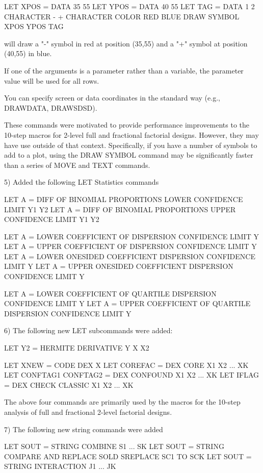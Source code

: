            LET XPOS = DATA 35 55
           LET YPOS = DATA 40 55
           LET TAG  = DATA  1  2
           CHARACTER  - +
           CHARACTER COLOR RED BLUE
           DRAW SYMBOL XPOS YPOS TAG

        will draw a "-" symbol in red at position (35,55) and a "+" symbol
        at position (40,55) in blue.

        If one of the arguments is a parameter rather than a variable, the
        parameter value will be used for all rows.

        You can specify screen or data coordinates in the standard way
        (e.g., DRAWDATA, DRAWSDSD).

    These commands were motivated to provide performance improvements to
    the 10-step macros for 2-level full and fractional factorial designs.
    However, they may have use outside of that context.  Specifically,
    if you have a number of symbols to add to a plot, using the
    DRAW SYMBOL command may be significantly faster than a series of
    MOVE and TEXT commands.

 5) Added the following LET Statistics commands

       LET A = DIFF OF BINOMIAL PROPORTIONS LOWER CONFIDENCE LIMIT Y1 Y2
       LET A = DIFF OF BINOMIAL PROPORTIONS UPPER CONFIDENCE LIMIT Y1 Y2

       LET A = LOWER COEFFICIENT OF DISPERSION CONFIDENCE LIMIT Y
       LET A = UPPER COEFFICIENT OF DISPERSION CONFIDENCE LIMIT Y
       LET A = LOWER ONESIDED COEFFICIENT DISPERSION CONFIDENCE LIMIT Y
       LET A = UPPER ONESIDED COEFFICIENT DISPERSION CONFIDENCE LIMIT Y

       LET A = LOWER COEFFICIENT OF QUARTILE DISPERSION CONFIDENCE LIMIT Y
       LET A = UPPER COEFFICIENT OF QUARTILE DISPERSION CONFIDENCE LIMIT Y

 6) The following new LET subcommands were added:

       LET Y2 = HERMITE DERIVATIVE Y X X2

       LET XNEW = CODE DEX X
       LET COREFAC = DEX CORE X1 X2 ... XK
       LET CONFTAG1 CONFTAG2 = DEX CONFOUND X1 X2 ... XK
       LET IFLAG = DEX CHECK CLASSIC X1 X2 ... XK

    The above four commands are primarily used by the macros for the
    10-step analysis of full and fractional 2-level factorial designs.

 7) The following new string commands were added

       LET SOUT = STRING COMBINE S1 ... SK
       LET SOUT = STRING COMPARE AND REPLACE SOLD SREPLACE SC1 TO SCK
       LET SOUT = STRING INTERACTION J1 ... JK

